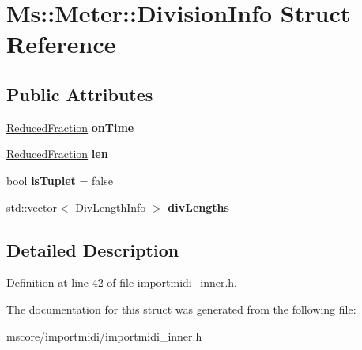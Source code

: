 \hypertarget{struct_ms_1_1_meter_1_1_division_info}{}\section{Ms\+:\+:Meter\+:\+:Division\+Info Struct Reference}
\label{struct_ms_1_1_meter_1_1_division_info}
\subsection*{Public Attributes}
\begin{DoxyCompactItemize}
\item 
\mbox{\label{struct_ms_1_1_meter_1_1_division_info_a9cc77bdd0e4a5996ac423de66b971126}} 
\hyperlink{class_ms_1_1_reduced_fraction}{Reduced\+Fraction} {\bfseries on\+Time}
\item 
\mbox{\label{struct_ms_1_1_meter_1_1_division_info_aa32ca9e25554bbf8f0afa2701500989f}} 
\hyperlink{class_ms_1_1_reduced_fraction}{Reduced\+Fraction} {\bfseries len}
\item 
\mbox{\label{struct_ms_1_1_meter_1_1_division_info_a16a0fded658783e44c96540e225e4e1e}} 
bool {\bfseries is\+Tuplet} = false
\item 
\mbox{\label{struct_ms_1_1_meter_1_1_division_info_a3083769e088eca56cd5d25a5a5cae473}} 
std\+::vector$<$ \hyperlink{struct_ms_1_1_meter_1_1_div_length_info}{Div\+Length\+Info} $>$ {\bfseries div\+Lengths}
\end{DoxyCompactItemize}


\subsection{Detailed Description}


Definition at line 42 of file importmidi\+\_\+inner.\+h.



The documentation for this struct was generated from the following file\+:\begin{DoxyCompactItemize}
\item 
mscore/importmidi/importmidi\+\_\+inner.\+h\end{DoxyCompactItemize}
